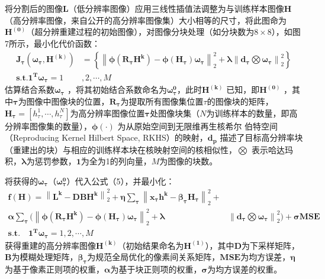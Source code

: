 将分割后的图像$\boldsymbol{L}$（低分辨率图像）应用三线性插值法调整为与训练样本图像$\boldsymbol{H}$（高分辨率图像，来自公开的高分辨率图像集）大小相等的尺寸，将此图命为$\boldsymbol{H^{(0)}}$（超分辨重建过程的初始图像），对图像分块处理（如分块数为$8\times8$），如图7所示，最小化代价函数：
\begin{equation}
 \label{eq5}
 \begin{split}
   \boldsymbol{J_{\tau }(\omega _{\tau },H^{(k)})} & =\left \{ \left \| \boldsymbol{\phi (R_{\tau }H^{k})}-\boldsymbol{\phi (H_{\tau })\omega _{\tau }} \right \| _{2}^{2}+\boldsymbol{\lambda} \left \| \boldsymbol{d_{\tau }}\bigotimes \boldsymbol{\omega _{\tau }} \right \|_{2}^{2}\right \} \\
   \boldsymbol{s.t. 1^{T}\omega _{\tau }}= 1 & ,2,\cdots ,M
 \end{split}
\end{equation}
估算结合系数$\boldsymbol{\omega _{\tau }}$ ，将其初始结合系数命名为$\boldsymbol{\omega_{\tau }^{0}}$，此时$\boldsymbol{H^{(k)}}$ 已知，即$\boldsymbol{H^{(0)}}$ ，其中$\boldsymbol{\tau}$为图像中图像块的位置，$\boldsymbol{R_{\tau }}$为提取所有图像集位置$\tau$的图像块的矩阵， $\boldsymbol{H_{\tau }}=\left [ h_{\tau }^{1},\cdots ,h_{\tau }^{N} \right ]$为高分辨率图像位置$\boldsymbol{\tau}$处图像块集（$N$为训练样本的数量，即高分辨率图像集的数量），$\boldsymbol{\phi (\cdot )}$ 为从原始空间到无限维再生核希尔 伯特空间（Reproducing Kernel Hilbert Space, RKHS）的映射，$\boldsymbol{d_{p}}$ 描述了目标高分辨率块（重建出的块）与相应的训练样本块在核映射空间的核相似性，$\bigotimes$ 表示哈达玛积，$\boldsymbol{\lambda}$为惩罚参数，$\boldsymbol{1}$为全为1的列向量，$M$为图像的块数。

将获得的$\boldsymbol{\omega _{\tau }}$（$\boldsymbol{\omega_{\tau }^{0}}$）代入公式（5），并最小化：
\begin{equation}
 \label{eq6}
 \begin{split}
   \boldsymbol{f(H)}= \left \| \boldsymbol{L^{k}}-\boldsymbol{DBH^{k}} \right \|_{2}^{2}+\boldsymbol{\eta \sum_{\tau }}\left \| \boldsymbol{x_{\tau }h^{k}}-\boldsymbol{\beta _{\tau }H_{\tau }} \right \|_{2}^{2}+ \\
   \boldsymbol{\alpha \sum_{\tau }}(\left \| \boldsymbol{\phi (R_{\tau }H^{k})}-\boldsymbol{\phi (H_{\tau })\omega _{\tau } }\right \|_{2}^{2}+ \boldsymbol{\lambda} & \left \| \boldsymbol{d_{\tau }}\bigotimes \boldsymbol{\omega _{\tau } }\right \|_{2}^{2})+\boldsymbol{\sigma MSE} \\
   \boldsymbol{s.t. \quad 1^{T}\omega _{\tau }}= 1,2,\cdots ,M \qquad \qquad \qquad \qquad \qquad \quad &
 \end{split}
\end{equation}
获得重建的高分辨率图像$\boldsymbol{H^{(k)}}$（初始结果命名为$\boldsymbol{H^{(1)}}$），其中$\boldsymbol{D}$为下采样矩阵，$\boldsymbol{B}$为模糊处理矩阵，$\boldsymbol{\beta _{\tau }}$为规范全局优化的像素间关系矩阵，$\boldsymbol{MSE}$为均方误差，$\boldsymbol{\eta }$为基于像素正则项的权重，$\boldsymbol{\alpha}$为基于块正则项的权重，$\boldsymbol{\sigma}$为均方误差的权重。


